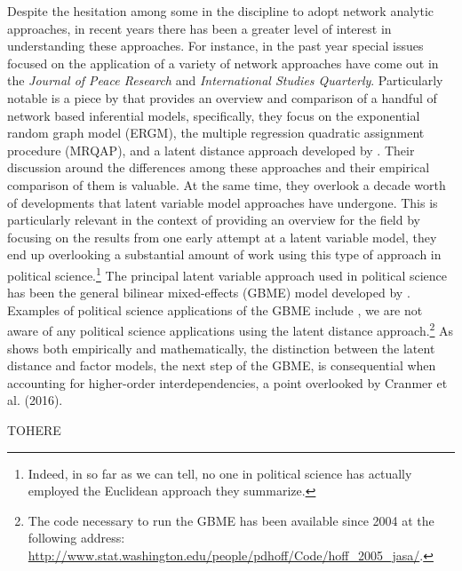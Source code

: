 Despite the hesitation among some in the discipline to adopt network analytic approaches, in recent years there has been a greater level of interest in understanding these approaches. For instance, in the past year special issues focused on the application of a variety of network approaches have come out in the \textit{Journal of Peace Research} and \textit{International Studies Quarterly}. Particularly notable is a piece by \citet{cranmer:etal:2016} that provides an overview and comparison of a handful of network based inferential models, specifically, they focus on the exponential random graph model (ERGM), the multiple regression quadratic assignment procedure (MRQAP), and a latent distance approach developed by \citet{hoff:etal:2002}. Their discussion around the differences among these approaches and their empirical comparison of them is  valuable. At the same time, they overlook a decade worth of developments that latent variable model approaches have undergone. This is particularly relevant in the context of providing an overview for the field by focusing on the results from one early attempt at a latent variable model, they end up overlooking a substantial amount of work using this type of approach in political science.\footnote{Indeed, in so far as we can tell, no one in political science has actually employed the Euclidean approach they summarize.} The principal latent variable approach used in political science has been the general bilinear mixed-effects (GBME) model developed by \citet{hoff:2005}. Examples of political science applications of the GBME include \citet{hoff:ward:2004,ward:etal:2007,cao:2009,can:2010, can:2012,breunig:2012,ward:etal:2012,can:ward:2014.metternich:etal:2015,green hill:2015}, we are not aware of any political science applications using the latent distance approach.\footnote{The code necessary to run the GBME has been available since 2004 at the following address: \url{http://www.stat.washington.edu/people/pdhoff/Code/hoff_2005_jasa/}.} As \citet{hoff:2008} shows both empirically and mathematically, the distinction between the latent distance and factor models, the next step of the GBME, is consequential when accounting for higher-order interdependencies, a point overlooked by Cranmer et al. (2016).

TOHERE 

